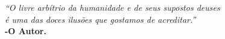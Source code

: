 \begin{epigrafe}
	\vspace*{\fill}
	\begin{flushright}
		\textit{``O livre arbítrio da humanidade e de seus supostos deuses \\é uma das doces ilusões que gostamos de acreditar.''}\\
		\textbf{-O Autor.}
	\end{flushright}
\end{epigrafe}